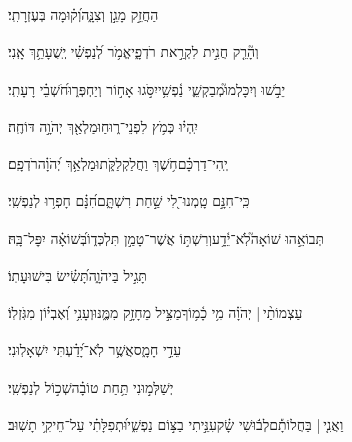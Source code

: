 \documentclass[12pt]{article}
\newcommand{\loc}[1]{\textsuperscript{\locf{#1}}}
\begin{document}
{\loc{ ב}~}‏הַחֲזֵ֣ק מָגֵ֣ן וְצִנָּ֑ה{\hfill}וְ֝ק֗וּמָה בְּעֶזְרָתִֽי׃\par

{\loc{ ג}~}‏וְהָ֘רֵ֤ק חֲנִ֣ית  לִקְרַ֣את רֹדְפָ֑י{\hfill}אֱמֹ֥ר לְ֝נַפְשִׁ֗י יְֽשֻׁעָתֵ֥ךְ אָֽנִי׃\par

{\loc{ ד}~}‏יֵבֹ֣שׁוּ וְיִכָּלְמוּ֮{\hfill}מְבַקְשֵׁ֢י נַ֫פְשִׁ֥י\newline\hspace*{.5em}יִסֹּ֣גוּ אָח֣וֹר וְיַחְפְּר֑וּ{\hfill}חֹ֝שְׁבֵ֗י רָעָתִֽי׃\par

{\loc{ ה}~}‏יִֽהְי֗וּ כְּמֹ֥ץ לִפְנֵי־ר֑וּחַ{\hfill}וּמַלְאַ֖ךְ יְהֹוָ֣ה דּוֹחֶֽה׃\par

{\loc{ ו}~}‏יְֽהִי־דַרְכָּ֗ם{\hfill}חֹ֥שֶׁךְ וַחֲלַקְלַקֹּ֑ת\newline\hspace*{.5em}וּמַלְאַ֥ךְ יְ֝הֹוָ֗ה{\hfill}רֹדְפָֽם׃\par

{\loc{ ז}~}‏כִּֽי־חִנָּ֣ם טָֽמְנוּ־לִ֭י שַׁ֣חַת רִשְׁתָּ֑ם{\hfill}חִ֝נָּ֗ם חָפְר֥וּ לְנַפְשִֽׁי׃\par

{\loc{ ח}~}‏תְּבוֹאֵ֣הוּ שׁוֹאָה֮{\hfill}לֹֽא־יֵ֫דָ֥ע\newline\hspace*{.5em}וְרִשְׁתּ֣וֹ אֲשֶׁר־טָמַ֣ן תִּלְכְּד֑וֹ{\hfill}בְּ֝שׁוֹאָ֗ה יִפׇּל־בָּֽהּ׃\par

{\loc{ ט}~}‏ תָּגִ֣יל בַּיהֹוָ֑ה{\hfill}תָּ֝שִׂ֗ישׂ בִּישׁוּעָתֽוֹ׃\par

{\loc{ י}~}‏עַצְמוֹתַ֨י |  {\hfill}יְהֹוָ֗ה מִ֥י כָ֫מ֥וֹךָ\newline\hspace*{.5em}מַצִּ֣יל  מֵחָזָ֣ק מִמֶּ֑נּוּ{\hfill}וְעָנִ֥י וְ֝אֶבְי֗וֹן מִגֹּֽזְלֽוֹ׃\par

{\loc{ יא}~}‏ עֵדֵ֣י חָמָ֑ס{\hfill}אֲשֶׁ֥ר לֹֽא־יָ֝דַ֗עְתִּי יִשְׁאָלֽוּנִי׃\par

{\loc{ יב}~}‏יְשַׁלְּמ֣וּנִי  תַּ֥חַת טוֹבָ֗ה{\hfill}שְׁכ֣וֹל לְנַפְשִֽׁי׃\par

{\loc{ יג}~}‏וַאֲנִ֤י |  בַּחֲלוֹתָ֡ם{\hfill}לְב֬וּשִׁי שָׂ֗ק\newline\hspace*{.5em}עִנֵּ֣יתִי בַצּ֣וֹם נַפְשִׁ֑י{\hfill}וּ֝תְפִלָּתִ֗י עַל־חֵיקִ֥י תָשֽׁוּב׃\par
\end{document}
